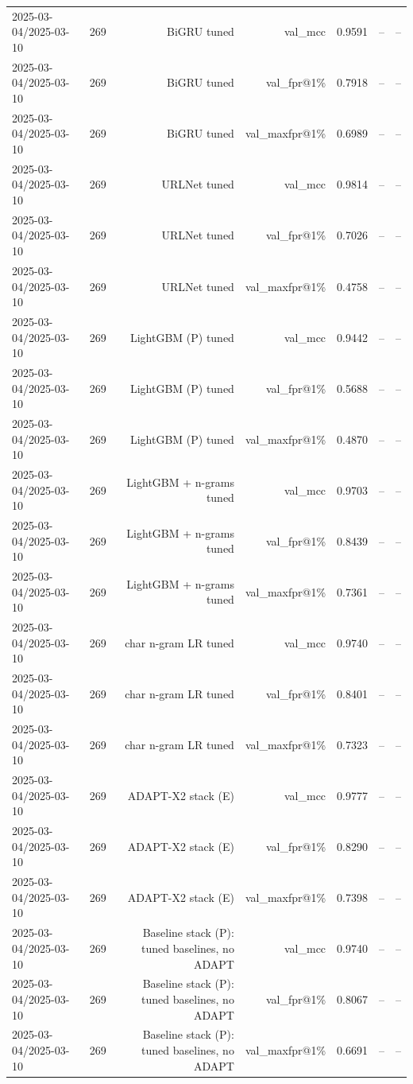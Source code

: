 \begin{table}[t]
\begin{tabular}{llrrrrr}
2025-03-04/2025-03-10 & 269 & BiGRU tuned & val\_mcc & 0.9591 & -- & -- \\
2025-03-04/2025-03-10 & 269 & BiGRU tuned & val\_fpr@1\% & 0.7918 & -- & -- \\
2025-03-04/2025-03-10 & 269 & BiGRU tuned & val\_maxfpr@1\% & 0.6989 & -- & -- \\
2025-03-04/2025-03-10 & 269 & URLNet tuned & val\_mcc & 0.9814 & -- & -- \\
2025-03-04/2025-03-10 & 269 & URLNet tuned & val\_fpr@1\% & 0.7026 & -- & -- \\
2025-03-04/2025-03-10 & 269 & URLNet tuned & val\_maxfpr@1\% & 0.4758 & -- & -- \\
2025-03-04/2025-03-10 & 269 & LightGBM (P) tuned & val\_mcc & 0.9442 & -- & -- \\
2025-03-04/2025-03-10 & 269 & LightGBM (P) tuned & val\_fpr@1\% & 0.5688 & -- & -- \\
2025-03-04/2025-03-10 & 269 & LightGBM (P) tuned & val\_maxfpr@1\% & 0.4870 & -- & -- \\
2025-03-04/2025-03-10 & 269 & LightGBM + n-grams tuned & val\_mcc & 0.9703 & -- & -- \\
2025-03-04/2025-03-10 & 269 & LightGBM + n-grams tuned & val\_fpr@1\% & 0.8439 & -- & -- \\
2025-03-04/2025-03-10 & 269 & LightGBM + n-grams tuned & val\_maxfpr@1\% & 0.7361 & -- & -- \\
2025-03-04/2025-03-10 & 269 & char n-gram LR tuned & val\_mcc & 0.9740 & -- & -- \\
2025-03-04/2025-03-10 & 269 & char n-gram LR tuned & val\_fpr@1\% & 0.8401 & -- & -- \\
2025-03-04/2025-03-10 & 269 & char n-gram LR tuned & val\_maxfpr@1\% & 0.7323 & -- & -- \\
2025-03-04/2025-03-10 & 269 & ADAPT-X2 stack (E) & val\_mcc & 0.9777 & -- & -- \\
2025-03-04/2025-03-10 & 269 & ADAPT-X2 stack (E) & val\_fpr@1\% & 0.8290 & -- & -- \\
2025-03-04/2025-03-10 & 269 & ADAPT-X2 stack (E) & val\_maxfpr@1\% & 0.7398 & -- & -- \\
2025-03-04/2025-03-10 & 269 & Baseline stack (P): tuned baselines, no ADAPT & val\_mcc & 0.9740 & -- & -- \\
2025-03-04/2025-03-10 & 269 & Baseline stack (P): tuned baselines, no ADAPT & val\_fpr@1\% & 0.8067 & -- & -- \\
2025-03-04/2025-03-10 & 269 & Baseline stack (P): tuned baselines, no ADAPT & val\_maxfpr@1\% & 0.6691 & -- & -- \\

\end{tabular}
\end{table}
